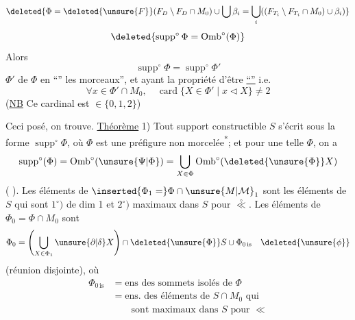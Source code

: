 \[
\deleted{\Phi=\deleted{\unsure{F}}(F_D\setminus F_D\cap M_0)\cup\bigcup\beta_i=\bigcup_i((F_{T_i}\setminus F_{T_i}\cap M_0)\cup\beta_i)}
\]
\[
\deleted{\operatorname{supp}^{\circ}\Phi=\operatorname{Omb}^{\circ}(\Phi)}
\]
Alors
\[
\operatorname{supp}^{\circ}\Phi=\operatorname{supp}^{\circ}\Phi'
\]
$\Phi'$  de $\Phi$ en ``'' les morceaux'', et ayant la propriété d'être \uline{``''}
i.e.
\[
\forall x\in\Phi'\cap M_0,\quad\operatorname{card}\{X\in\Phi'\mid x\mathrel{\triangleleft}X\}\ne2
\]
(\uline{NB} Ce cardinal est  $\in\{0,1,2\}$)

Ceci posé, on trouve.
\uline{Théorème} 1) Tout support constructible $S$ s'écrit sous la forme $\operatorname{supp}^{\circ}\Phi$, où $\Phi$ est une préfigure non morcelée\textsuperscript{*};
et pour une telle $\Phi$, on a
\[
\operatorname{supp}^{\circ}(\Phi)=\operatorname{Omb}^{\circ}(\unsure{\Psi|\Phi})=\bigcup_{X\in\Phi}\operatorname{Omb}^{\circ}(\deleted{\unsure{\Phi}}X)
\]
( ).
Les éléments de $\inserted{\Phi_1=}\Phi\cap\unsure{M|\mathcal{M}}_1$ sont les éléments de $S$ qui sont  $1^{\circ})$ de dim 1 et $2^{\circ})$ maximaux dans $S$ pour $\overset{\circ}{\ll}$.  Les éléments de $\Phi_0=\Phi\cap M_0$ sont  
\[
\Phi_0=\left(\bigcup_{X\in\Phi_1}\unsure{\partial|\delta}X\right)\cap\deleted{\unsure{\Phi}}S\cup\Phi_{0\,\mathrm{is}}\quad\deleted{\unsure{\phi}}
\]
(réunion disjointe), où 
\[
\begin{aligned}
\Phi_{0\,\mathrm{is}}&=\text{ens des sommets isolés de }\Phi\\
&=\text{ens. des éléments de }S\cap M_0\text{ qui}\\
&\qquad\text{sont maximaux dans }S\text{ pour }\ll
\end{aligned}
\]

